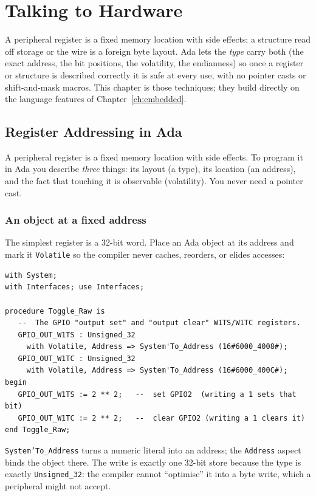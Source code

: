 \chapter{Talking to Hardware}
\label{ch:hardware}

A peripheral register is a fixed memory location with side effects; a structure
read off storage or the wire is a foreign byte layout. Ada lets the \emph{type}
carry both (the exact address, the bit positions, the volatility, the
endianness) so once a register or structure is described correctly it is safe at
every use, with no pointer casts or shift-and-mask macros. This chapter is those
techniques; they build directly on the language features of
Chapter~\ref{ch:embedded}.

\section{Register Addressing in Ada}
\label{ch:registers}

A peripheral register is a fixed memory location with side effects. To program it
in Ada you describe \emph{three} things: its layout (a type), its location (an
address), and the fact that touching it is observable (volatility). You never
need a pointer cast.

\subsection{An object at a fixed address}

The simplest register is a 32-bit word. Place an Ada object at its address and
mark it \texttt{Volatile} so the compiler never caches, reorders, or elides
accesses:

\begin{lstlisting}
with System;
with Interfaces; use Interfaces;

procedure Toggle_Raw is
   --  The GPIO "output set" and "output clear" W1TS/W1TC registers.
   GPIO_OUT_W1TS : Unsigned_32
     with Volatile, Address => System'To_Address (16#6000_4008#);
   GPIO_OUT_W1TC : Unsigned_32
     with Volatile, Address => System'To_Address (16#6000_400C#);
begin
   GPIO_OUT_W1TS := 2 ** 2;   --  set GPIO2  (writing a 1 sets that bit)
   GPIO_OUT_W1TC := 2 ** 2;   --  clear GPIO2 (writing a 1 clears it)
end Toggle_Raw;
\end{lstlisting}

\texttt{System'To\_Address} turns a numeric literal into an address; the
\texttt{Address} aspect binds the object there. The write is exactly one 32-bit store because the type is exactly
\texttt{Unsigned\_32}: the compiler
cannot ``optimise'' it into a byte write, which a peripheral might not accept.

